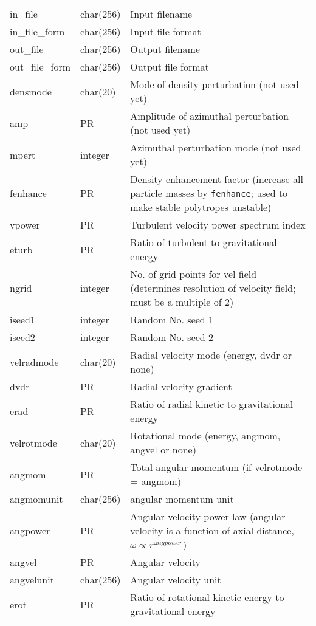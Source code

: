 \documentclass[a4paper]{article}
\newcommand{\var}[1]{\texttt{#1}}
\begin{document}
\begin{center}
\begin{supertabular}{|p{3cm}|p{2cm}|p{8cm}|}
in\_file         & char(256) & Input filename \\
in\_file\_form   & char(256) & Input file format \\
out\_file        & char(256) & Output filename \\
out\_file\_form  & char(256) & Output file format \\
densmode         & char(20)  & Mode of density perturbation (not used yet) \\
amp              & PR        & Amplitude of azimuthal perturbation (not used yet) \\
mpert            & integer   & Azimuthal perturbation mode (not used yet) \\
fenhance         & PR        & Density enhancement factor (increase all particle masses by \var{fenhance}; used to make stable polytropes unstable)\\
vpower           & PR        & Turbulent velocity power spectrum index\\
eturb            & PR        & Ratio of turbulent to gravitational energy \\
ngrid            & integer   & No. of grid points for vel field 
                              (determines resolution of velocity field; 
                               must be a multiple of 2)  \\
iseed1           & integer   & Random No. seed 1 \\
iseed2           & integer   & Random No. seed 2 \\
velradmode       & char(20)  & Radial velocity mode (energy, dvdr or none) \\
dvdr             & PR        & Radial velocity gradient \\
erad             & PR        & Ratio of radial kinetic to gravitational energy \\
velrotmode       & char(20)  & Rotational mode (energy, angmom, angvel or none)\\
angmom           & PR        & Total angular momentum (if velrotmode = angmom) \\
angmomunit       & char(256)  & angular momentum unit \\
angpower         & PR        & Angular velocity power law 
                               (angular velocity is a function of axial 
                               distance, $\omega \propto r^{\var angpower}$)\\
angvel           & PR        & Angular velocity \\
angvelunit       & char(256)  & Angular velocity unit \\
erot             & PR        & Ratio of rotational kinetic energy to gravitational energy \\
\end{supertabular}
\end{center}
\end{document}
